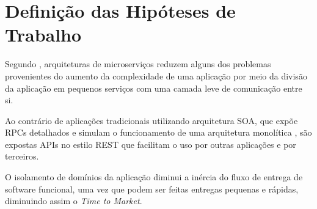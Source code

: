 \section{Definição das Hipóteses de Trabalho}

  Segundo \cite{Fowler2016}, arquiteturas de microserviços reduzem
  alguns dos problemas provenientes do aumento da complexidade de uma aplicação
  por meio da divisão da aplicação em pequenos serviços com uma camada leve
  de comunicação entre si.

  Ao contrário de aplicações tradicionais utilizando arquitetura SOA, que expõe
  RPCs detalhados e simulam o funcionamento de uma arquitetura monolítica
  \cite{Erl2008}, são expostas APIs no estilo REST que facilitam o uso por
  outras aplicações e por terceiros.

  O isolamento de domínios da aplicação diminui a inércia do fluxo de entrega
  de software funcional, uma vez que podem ser feitas entregas pequenas e
  rápidas, diminuindo assim o \textit{Time to Market}.
